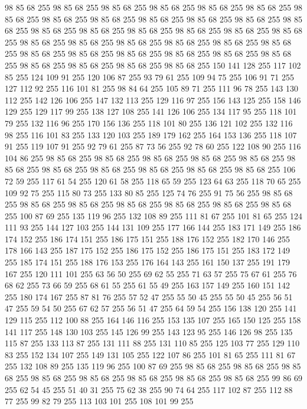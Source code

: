 98 85 68 255 98 85 68 255 98 85 68 255 98 85 68 255 98 85 68 255 98 85 68 255 98 85 68 255 98 85 68 255 98 85 68 255 98 85 68 255 98 85 68 255 98 85 68 255 98 85 68 255 98 85 68 255 98 85 68 255 98 85 68 255 98 85 68 255 98 85 68 255 98 85 68 255 98 85 68 255 98 85 68 255 98 85 68 255 98 85 68 255 98 85 68 255 98 85 68 255 98 85 68 255 98 85 68 255 98 85 68 255 98 85 68 255 98 85 68 255 98 85 68 255 98 85 68 255 98 85 68 255 98 85 68 255 98 85 68 255 150 141 128 255 117 102 85 255 124 109 91 255 120 106 87 255 93 79 61 255 109 94 75 255 106 91 71 255 127 112 92 255 116 101 81 255 98 84 64 255 105 89 71 255 111 96 78 255 143 130 112 255 142 126 106 255 147 132 113 255 129 116 97 255 156 143 125 255 158 146 129 255 129 117 99 255 138 127 108 255 141 126 106 255 134 117 95 255 118 101 79 255 132 116 96 255 170 156 136 255 118 101 80 255 136 121 102 255 132 116 98 255 116 101 83 255
133 120 103 255 189 179 162 255 164 153 136 255 118 107 91 255 119 107 91 255 92 79 61 255 87 73 56 255 92 78 60 255 122 108 90 255 116 104 86 255 98 85 68 255 98 85 68 255 98 85 68 255 98 85 68 255 98 85 68 255 98 85 68 255 98 85 68 255 98 85 68 255 98 85 68 255 98 85 68 255 98 85 68 255 106 72 59 255 117 61 54 255 120 61 58 255 118 65 59 255 123 64 63 255 118 70 65 255 109 92 75 255 115 80 73 255 133 80 85 255 125 74 76 255 91 75 56 255 98 85 68 255 98 85 68 255 98 85 68 255 98 85 68 255 98 85 68 255 98 85 68 255 98 85 68 255 100 87 69 255 135 119 96 255 132 108 89 255 111 81 67 255 101 81 65 255 124 111 93 255 144 127 103 255 144 131 109 255 177 166 144 255 183 171 149 255 186 174 152 255 186 174 151 255 186 175 151 255 188 176 152 255 182 170 146 255 178 166 143 255 187 175 152 255 186 175 152 255 186 175 151 255 183 172 149 255 185 174 151 255 188 176 153 255 176 164 143 255 161 150 137 255 191 179 167 255
120 111 101 255 63 56 50 255 69 62 55 255 71 63 57 255 75 67 61 255 76 68 62 255 73 66 59 255 68 61 55 255 61 55 49 255 163 157 149 255 160 151 142 255 180 174 167 255 87 81 76 255 57 52 47 255 55 50 45 255 55 50 45 255 56 51 47 255 59 54 50 255 67 62 57 255 56 51 47 255 64 59 54 255 156 138 120 255 141 129 115 255 112 100 88 255 164 146 116 255 153 135 107 255 165 150 125 255 158 141 117 255 148 130 103 255 145 126 99 255 143 123 95 255 146 126 98 255 135 115 87 255 133 113 87 255 131 111 88 255 131 110 85 255 125 103 77 255 129 110 83 255 152 134 107 255 149 131 105 255 122 107 86 255 101 81 65 255 111 81 67 255 132 108 89 255 135 119 96 255 100 87 69 255 98 85 68 255 98 85 68 255 98 85 68 255 98 85 68 255 98 85 68 255 98 85 68 255 98 85 68 255 98 85 68 255 99 86 69 255 62 54 45 255 51 40 31 255 75 62 38 255 90 74 64 255 117 102 87 255 112 88 77 255 99 82 79 255 113 103 101 255 108 101 99 255
